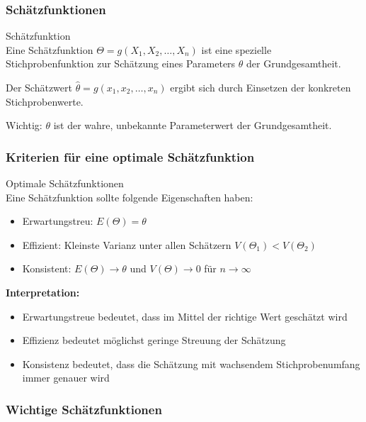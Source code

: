 \subsubsection{Schätzfunktionen}

\begin{definition}{Schätzfunktion}\\
Eine Schätzfunktion $\Theta = g(X_1,X_2,\ldots,X_n)$ ist eine spezielle Stichprobenfunktion zur Schätzung eines Parameters $\theta$ der Grundgesamtheit.

Der Schätzwert $\hat{\theta} = g(x_1,x_2,\ldots,x_n)$ ergibt sich durch Einsetzen der konkreten Stichprobenwerte.

Wichtig: $\theta$ ist der wahre, unbekannte Parameterwert der Grundgesamtheit.
\end{definition}

\subsubsection{Kriterien für eine optimale Schätzfunktion}

\begin{concept}{Optimale Schätzfunktionen}\\
Eine Schätzfunktion sollte folgende Eigenschaften haben:

\begin{itemize}
    \item Erwartungstreu: $E(\Theta) = \theta$
    \item Effizient: Kleinste Varianz unter allen Schätzern $V(\Theta_1)<V(\Theta_2)$
    \item Konsistent: $E(\Theta) \to \theta$ und $V(\Theta) \to 0$ für $n \to \infty$
\end{itemize}

\textbf{Interpretation:}
\begin{itemize}
  \item Erwartungstreue bedeutet, dass im Mittel der richtige Wert geschätzt wird
  \item Effizienz bedeutet möglichst geringe Streuung der Schätzung
  \item Konsistenz bedeutet, dass die Schätzung mit wachsendem Stichprobenumfang immer genauer wird
\end{itemize}
\end{concept}

\subsubsection{Wichtige Schätzfunktionen}

